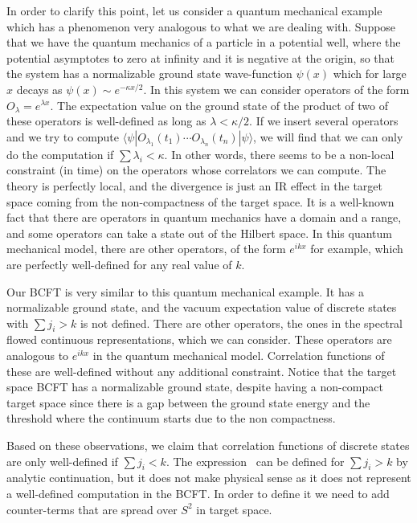 In order to clarify this point, let us consider a quantum mechanical
example which has a phenomenon very analogous to what we are dealing with.
Suppose that we have the quantum mechanics of a particle in a potential
well, where the potential asymptotes to zero at infinity and it is
negative at the origin, so that the system has a normalizable ground
state wave-function $\psi(x) $ which for large $x$ decays as
$\psi(x) \sim e^{- \kappa x/2}$. In this system we can consider
operators of the form $O_\lambda = e^{ \lambda x}$. The expectation
value on the ground state of the product of two
 of these operators is well-defined as long as $\lambda < \kappa/2 $.
If we insert several operators and we try to compute
$\langle \psi |O_{\lambda_1}(t_1) \cdots O_{\lambda_n}(t_n) |\psi \rangle
$, we will find that we can only do the computation if
$\sum \lambda_i <  \kappa $.
In other words, there seems to be a non-local constraint (in time)
on the operators whose correlators we can compute. The theory is
perfectly local, and the divergence is just an IR effect in the target
space coming from the non-compactness of the target space.
It is a well-known fact that there are operators in quantum
mechanics have a domain and a range, and some operators can take
a state out of the Hilbert space.
In this quantum mechanical model, there are other operators, of
the form $e^{ikx}$ for example, which are perfectly well-defined
for any real value of $k$.

Our BCFT is very similar to this quantum mechanical example.
It has a normalizable ground state, and the vacuum
expectation value of discrete states
with $\sum j_i > k$ is not defined.
There are other operators, the ones in the spectral flowed
 continuous representations,
which we can consider. These operators are analogous to
$e^{ikx}$ in the quantum mechanical model.
Correlation functions of these are well-defined without any
additional constraint.
Notice that the target space BCFT has a normalizable ground state,
despite having a non-compact target space since there is
a gap between the ground state energy and the threshold
where the continuum starts due to the non compactness.

Based on these observations, we claim that correlation functions of
discrete states are only well-defined if
$\sum j_i < k$. The expression \teschnerthree\ can be defined for
$\sum j_i > k$ by analytic continuation,
but it does not make physical sense as it does not
represent a well-defined computation in the BCFT. In
order to define it we need to add counter-terms that are spread over
$S^2$ in target space.

